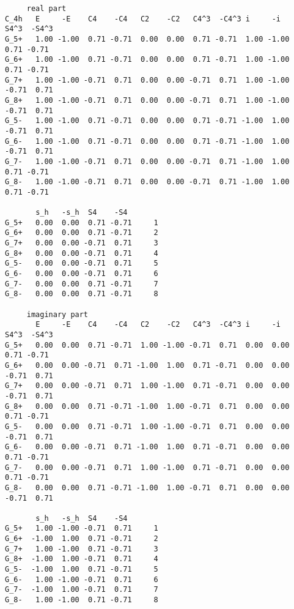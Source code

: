 \documentclass[12pt,a4paper,twoside]{report}
\begin{document}
\begin{tcolorbox}
\begin{scriptsize}
\begin{verbatim}
     real part
C_4h   E     -E    C4    -C4   C2    -C2   C4^3  -C4^3 i     -i    S4^3  -S4^3
G_5+   1.00 -1.00  0.71 -0.71  0.00  0.00  0.71 -0.71  1.00 -1.00  0.71 -0.71
G_6+   1.00 -1.00  0.71 -0.71  0.00  0.00  0.71 -0.71  1.00 -1.00  0.71 -0.71
G_7+   1.00 -1.00 -0.71  0.71  0.00  0.00 -0.71  0.71  1.00 -1.00 -0.71  0.71
G_8+   1.00 -1.00 -0.71  0.71  0.00  0.00 -0.71  0.71  1.00 -1.00 -0.71  0.71
G_5-   1.00 -1.00  0.71 -0.71  0.00  0.00  0.71 -0.71 -1.00  1.00 -0.71  0.71
G_6-   1.00 -1.00  0.71 -0.71  0.00  0.00  0.71 -0.71 -1.00  1.00 -0.71  0.71
G_7-   1.00 -1.00 -0.71  0.71  0.00  0.00 -0.71  0.71 -1.00  1.00  0.71 -0.71
G_8-   1.00 -1.00 -0.71  0.71  0.00  0.00 -0.71  0.71 -1.00  1.00  0.71 -0.71

       s_h   -s_h  S4    -S4  
G_5+   0.00  0.00  0.71 -0.71     1
G_6+   0.00  0.00  0.71 -0.71     2
G_7+   0.00  0.00 -0.71  0.71     3
G_8+   0.00  0.00 -0.71  0.71     4
G_5-   0.00  0.00 -0.71  0.71     5
G_6-   0.00  0.00 -0.71  0.71     6
G_7-   0.00  0.00  0.71 -0.71     7
G_8-   0.00  0.00  0.71 -0.71     8

     imaginary part
       E     -E    C4    -C4   C2    -C2   C4^3  -C4^3 i     -i    S4^3  -S4^3
G_5+   0.00  0.00  0.71 -0.71  1.00 -1.00 -0.71  0.71  0.00  0.00  0.71 -0.71
G_6+   0.00  0.00 -0.71  0.71 -1.00  1.00  0.71 -0.71  0.00  0.00 -0.71  0.71
G_7+   0.00  0.00 -0.71  0.71  1.00 -1.00  0.71 -0.71  0.00  0.00 -0.71  0.71
G_8+   0.00  0.00  0.71 -0.71 -1.00  1.00 -0.71  0.71  0.00  0.00  0.71 -0.71
G_5-   0.00  0.00  0.71 -0.71  1.00 -1.00 -0.71  0.71  0.00  0.00 -0.71  0.71
G_6-   0.00  0.00 -0.71  0.71 -1.00  1.00  0.71 -0.71  0.00  0.00  0.71 -0.71
G_7-   0.00  0.00 -0.71  0.71  1.00 -1.00  0.71 -0.71  0.00  0.00  0.71 -0.71
G_8-   0.00  0.00  0.71 -0.71 -1.00  1.00 -0.71  0.71  0.00  0.00 -0.71  0.71

       s_h   -s_h  S4    -S4  
G_5+   1.00 -1.00 -0.71  0.71     1
G_6+  -1.00  1.00  0.71 -0.71     2
G_7+   1.00 -1.00  0.71 -0.71     3
G_8+  -1.00  1.00 -0.71  0.71     4
G_5-  -1.00  1.00  0.71 -0.71     5
G_6-   1.00 -1.00 -0.71  0.71     6
G_7-  -1.00  1.00 -0.71  0.71     7
G_8-   1.00 -1.00  0.71 -0.71     8
\end{verbatim}
\end{scriptsize}
\end{tcolorbox}
\end{document}
